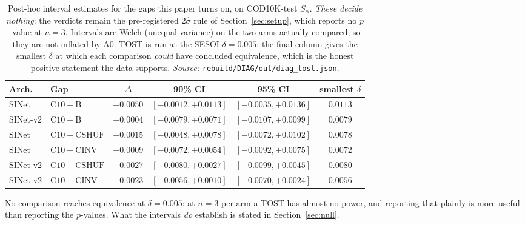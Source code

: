 \begin{table}[t]
\caption{Post-hoc interval estimates for the gaps this paper turns on, on COD10K-test $S_\alpha$. \emph{These decide nothing}: the verdicts remain the pre-registered $2\hat{\sigma}$ rule of Section~\ref{sec:setup}, which reports no $p$-value at $n=3$. Intervals are Welch (unequal-variance) on the two arms actually compared, so they are not inflated by A0. TOST is run at the SESOI $\delta = 0.005$; the final column gives the smallest $\delta$ at which each comparison \emph{could} have concluded equivalence, which is the honest positive statement the data supports. \emph{Source:} \texttt{rebuild/DIAG/out/diag\_tost.json}.}
\label{tab:tost}
\begin{center}
\footnotesize
\setlength{\tabcolsep}{4pt}
\begin{tabular}{@{}llcccc@{}}
\toprule
Arch. & Gap & $\Delta$ & 90\% CI & 95\% CI & smallest $\delta$ \\
\midrule
SINet & $\mathrm{C10}-\mathrm{B}$ & $+0.0050$ & $[-0.0012, +0.0113]$ & $[-0.0035, +0.0136]$ & $0.0113$ \\
SINet-v2 & $\mathrm{C10}-\mathrm{B}$ & $-0.0004$ & $[-0.0079, +0.0071]$ & $[-0.0107, +0.0099]$ & $0.0079$ \\
SINet & $\mathrm{C10}-\mathrm{CSHUF}$ & $+0.0015$ & $[-0.0048, +0.0078]$ & $[-0.0072, +0.0102]$ & $0.0078$ \\
SINet & $\mathrm{C10}-\mathrm{CINV}$ & $-0.0009$ & $[-0.0072, +0.0054]$ & $[-0.0092, +0.0075]$ & $0.0072$ \\
SINet-v2 & $\mathrm{C10}-\mathrm{CSHUF}$ & $-0.0027$ & $[-0.0080, +0.0027]$ & $[-0.0099, +0.0045]$ & $0.0080$ \\
SINet-v2 & $\mathrm{C10}-\mathrm{CINV}$ & $-0.0023$ & $[-0.0056, +0.0010]$ & $[-0.0070, +0.0024]$ & $0.0056$ \\
\bottomrule
\end{tabular}
\end{center}
\footnotesize No comparison reaches equivalence at $\delta = 0.005$: at $n = 3$ per arm a TOST has almost no power, and reporting that plainly is more useful than reporting the $p$-values. What the intervals \emph{do} establish is stated in Section~\ref{sec:null}.
\end{table}
